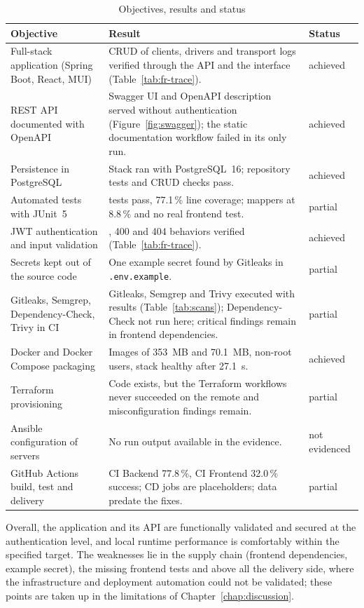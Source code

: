 \begin{table}[H]
\centering\small
\caption{Objectives, results and status}\label{tab:synthesis}
\begin{tabularx}{\linewidth}{@{}>{\raggedright\arraybackslash}p{3.3cm}>{\raggedright\arraybackslash}X>{\raggedright\arraybackslash}p{1.9cm}@{}}
\toprule
\textbf{Objective} & \textbf{Result} & \textbf{Status} \\
\midrule
Full-stack application (Spring Boot, React, MUI) & CRUD of clients, drivers and transport logs verified through the API and the interface (Table~\ref{tab:fr-trace}). & achieved \\
REST API documented with OpenAPI & Swagger UI and OpenAPI description served without authentication (Figure~\ref{fig:swagger}); the static documentation workflow failed in its only run. & achieved \\
Persistence in PostgreSQL & Stack ran with PostgreSQL~16; repository tests and CRUD checks pass. & achieved \\
Automated tests with JUnit~5 & 82 tests pass, 77.1\,\% line coverage; mappers at 8.8\,\% and no real frontend test. & partial \\
JWT authentication and input validation & 401, 400 and 404 behaviors verified (Table~\ref{tab:fr-trace}). & achieved \\
Secrets kept out of the source code & One example secret found by Gitleaks in \texttt{.env.example}. & partial \\
Gitleaks, Semgrep, Dependency-Check, Trivy in CI & Gitleaks, Semgrep and Trivy executed with results (Table~\ref{tab:scans}); Dependency-Check not run here; critical findings remain in frontend dependencies. & partial \\
Docker and Docker Compose packaging & Images of 353~MB and 70.1~MB, non-root users, stack healthy after 27.1~s. & achieved \\
Terraform provisioning & Code exists, but the Terraform workflows never succeeded on the remote and misconfiguration findings remain. & partial \\
Ansible configuration of servers & No run output available in the evidence. & not evidenced \\
GitHub Actions build, test and delivery & CI Backend 77.8\,\%, CI Frontend 32.0\,\% success; CD jobs are placeholders; data predate the fixes. & partial \\
\bottomrule
\end{tabularx}
\end{table}

Overall, the application and its API are functionally validated and secured at the authentication level, and local runtime performance is comfortably within the specified target. The weaknesses lie in the supply chain (frontend dependencies, example secret), the missing frontend tests and above all the delivery side, where the infrastructure and deployment automation could not be validated; these points are taken up in the limitations of Chapter~\ref{chap:discussion}.
